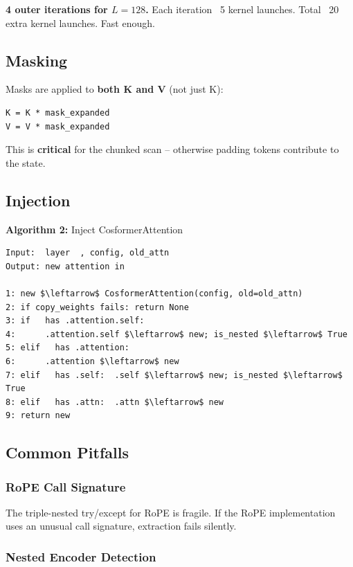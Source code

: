 \textbf{4 outer iterations for $L = 128$.} Each iteration ~5 kernel launches. 
Total ~20 extra kernel launches. Fast enough.

\subsection{Masking}

Masks are applied to \textbf{both K and V} (not just K):

\begin{lstlisting}
K = K * mask_expanded
V = V * mask_expanded
\end{lstlisting}

This is \textbf{critical} for the chunked scan -- otherwise padding tokens 
contribute to the state.

\subsection{Injection}

\textbf{Algorithm 2:} Inject CosformerAttention
\begin{lstlisting}
Input:  layer  , config, old_attn
Output: new attention in  

1: new $\leftarrow$ CosformerAttention(config, old=old_attn)
2: if copy_weights fails: return None
3: if   has .attention.self:
4:      .attention.self $\leftarrow$ new; is_nested $\leftarrow$ True
5: elif   has .attention:
6:      .attention $\leftarrow$ new
7: elif   has .self:  .self $\leftarrow$ new; is_nested $\leftarrow$ True
8: elif   has .attn:  .attn $\leftarrow$ new
9: return new
\end{lstlisting}

\subsection{Common Pitfalls}

\subsubsection{RoPE Call Signature}

The triple-nested try/except for RoPE is fragile. If the RoPE implementation 
uses an unusual call signature, extraction fails silently.

\subsubsection{Nested Encoder Detection}

